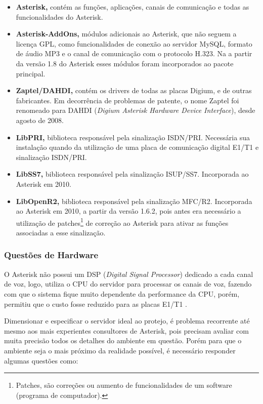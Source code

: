 \begin{itemize}
  \item \textbf{Asterisk,} contém as funções, aplicações, canais de comunicação e todas as funcionalidades do Asterisk.
  \item \textbf{Asterisk-AddOns,} módulos adicionais ao Asterisk, que não seguem a licença GPL, como funcionalidades de conexão ao servidor MySQL, formato de áudio MP3 e o canal de comunicação com o protocolo H.323. Na a partir da versão 1.8 do Asterisk esses módulos foram incorporados ao pacote principal.
  \item \textbf{Zaptel/DAHDI,} contém os drivers de todas as placas Digium, e de outras fabricantes. Em decorrência de problemas de patente, o nome Zaptel foi renomeado para DAHDI (\textit{Digium Asterisk Hardware Device Interface}), desde agosto de 2008.
  \item \textbf{LibPRI,} biblioteca responsável pela sinalização ISDN/PRI. Necessária sua instalação quando da utilização de uma placa de comunicação digital E1/T1 e sinalização ISDN/PRI.
  \item \textbf{LibSS7,} biblioteca responsável pela sinalização ISUP/SS7. Incorporada ao Asterisk em 2010.
  \item \textbf{LibOpenR2,} biblioteca responsável pela sinalização MFC/R2. Incorporada ao Asterisk em 2010, a partir da versão 1.6.2, pois antes era necessário a utilização de patches\footnote{Patches, são correções ou aumento de funcionalidades de um software (programa de computador).} de correção ao Asterisk para ativar as funções associadas a esse sinalização.
\end{itemize}

\subsubsection{Questões de Hardware}
O Asterisk não possui um DSP (\textit{Digital Signal Processor}) dedicado a cada canal de voz, logo, utiliza o CPU do servidor para processar os canais de voz, fazendo com que o sistema fique muito dependente da performance da CPU, porém, permitiu que o custo fosse reduzido para as placas E1/T1 \cite{flavioeduardoandredade2005}.

Dimensionar e especificar o servidor ideal ao protejo, é problema recorrente até mesmo aos mais experientes consultores de Asterisk, pois precisam avaliar com muita precisão todos os detalhes do ambiente em questão. Porém para que o ambiente seja o mais próximo da realidade possível, é necessário responder algumas questões como: \cite{alexandrekeller2014}

